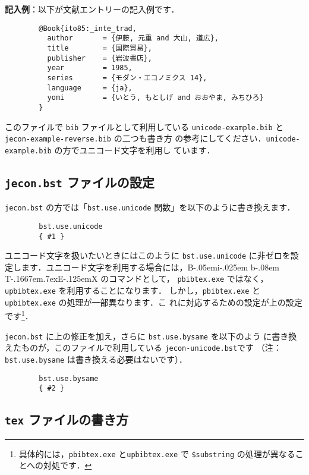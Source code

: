 \documentclass{ltjsarticle}
\def\BibTeX{{\rm B\kern-.05em{\sc i\kern-.025em b}\kern-.08em
    T\kern-.1667em\lower.7ex\hbox{E}\kern-.125emX}}
\begin{document}
\vspace*{1em}

\textbf{記入例}：以下が文献エントリーの記入例です．
\begin{verbatim}
        @Book{ito85:_inte_trad,
          author       = {伊藤, 元重 and 大山, 道広},
          title        = {国際貿易},
          publisher    = {岩波書店},
          year         = 1985,
          series       = {モダン・エコノミクス 14},
          language     = {ja},
          yomi         = {いとう, もとしげ and おおやま, みちひろ}
        }
\end{verbatim}

このファイルで \texttt{bib} ファイルとして利用している
\texttt{unicode-example.bib} と \texttt{jecon-example-reverse.bib} の二つも書き方
の参考にしてください．\texttt{unicode-example.bib} の方でユニコード文字を利用し
ています．

\subsection{\texttt{jecon.bst} ファイルの設定}

\texttt{jecon.bst} の方では「\texttt{bst.use.unicode} 関数」を以下のように書き換えます．
\begin{verbatim}
        bst.use.unicode
        { #1 }
\end{verbatim}

ユニコード文字を扱いたいときにはこのように \texttt{bst.use.unicode} に非ゼロを設
定します．ユニコード文字を利用する場合には，\BibTeX{} のコマンドとして，
\texttt{pbibtex.exe} ではなく，\texttt{upbibtex.exe} を利用することになります．
しかし，\texttt{pbibtex.exe} と \texttt{upbibtex.exe} の処理が一部異なります．こ
れに対応するための設定が上の設定です\footnote{具体的には，\texttt{pbibtex.exe}
と\texttt{upbibtex.exe} で \texttt{\$substring} の処理が異なることへの対処です．}．
 
\vspace*{1em}

\texttt{jecon.bst} に上の修正を加え，さらに \texttt{bst.use.bysame} を以下のよう
に書き換えたものが，このファイルで利用している \texttt{jecon-unicode.bst}です
（注：\texttt{bst.use.bysame} は書き換える必要はないです）．
\begin{verbatim}
        bst.use.bysame
        { #2 }
\end{verbatim}

\subsection{\texttt{tex} ファイルの書き方}
\end{document}
